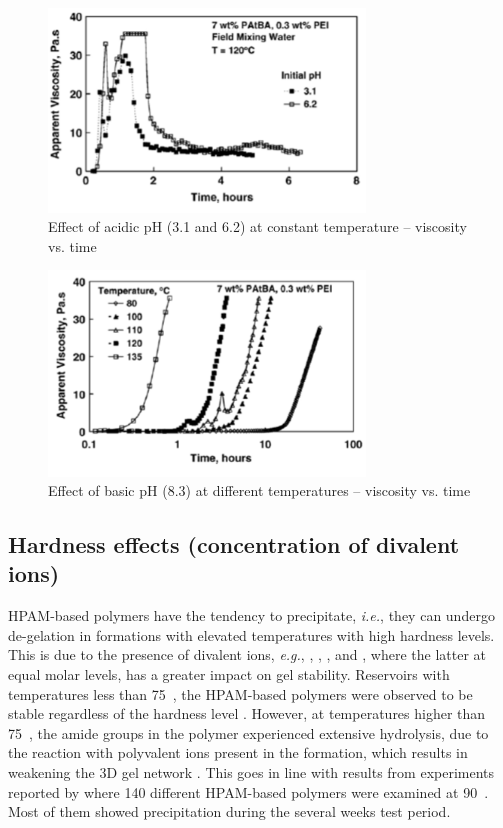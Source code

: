 \begin{figure}
    \centering
    \includegraphics[width=0.75\textwidth]{img/fig/almuntasheriAcidicpH.png}
    \caption{Effect of acidic pH (3.1 and 6.2) at constant temperature – viscosity vs. time \citep{Al-Muntasheri2007}}
    \label{fig:almuntasheriAcidicpH} %
\end{figure}

\begin{figure}
    \centering
    \includegraphics[width=0.75\textwidth]{img/fig/almuntasheriBasicpH.png}
    \caption{Effect of basic pH (8.3) at different temperatures – viscosity vs. time \citep{Al-Muntasheri2007}}
    \label{fig:almuntasheriBasicpH} %
\end{figure}

\subsection{Hardness effects (concentration of divalent ions)}

HPAM-based polymers have the tendency to precipitate, \textit{i.e.}, they can undergo de-gelation in formations with elevated temperatures with high hardness levels. This is due to the presence of divalent ions, \textit{e.g.}, , , , and , where the latter at equal molar levels, has a greater impact on gel stability. Reservoirs with temperatures less than 75~\celsius, the HPAM-based polymers were observed to be stable regardless of the hardness level \citep{Moradi1987}. However, at temperatures higher than 75~\celsius, the amide groups in the polymer experienced extensive hydrolysis, due to the reaction with polyvalent ions present in the formation, which results in weakening the 3D gel network \citep{Al-Muntasheri2012, Stahl1988}. This goes in line with results from experiments reported by \citet{Davison1982} where 140 different HPAM-based polymers were examined at 90~\celsius. Most of them showed precipitation during the several weeks test period.


